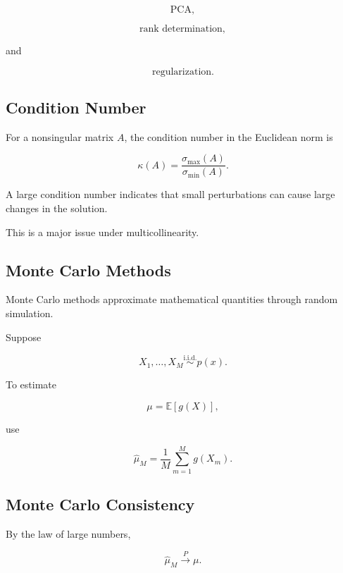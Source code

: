 \[
\boxed{
\text{PCA},
}
\]

\[
\boxed{
\text{rank determination},
}
\]

and

\[
\boxed{
\text{regularization}.
}
\]

\subsection{Condition Number}
\label{subsec:condition-number-statistics}

For a nonsingular matrix \(A\), the condition number in the Euclidean norm
is

\[
\boxed{
\kappa(A)
=
\frac{
\sigma_{\max}(A)
}{
\sigma_{\min}(A)
}.
}
\]

A large condition number indicates that small perturbations can cause
large changes in the solution.

This is a major issue under multicollinearity.

\subsection{Monte Carlo Methods}
\label{subsec:monte-carlo-methods-statistics}

Monte Carlo methods approximate mathematical quantities through random
simulation.

Suppose

\[
X_1,\ldots,X_M
\overset{\text{i.i.d.}}{\sim}
p(x).
\]

To estimate

\[
\mu
=
\mathbb{E}
[
g(X)
],
\]

use

\[
\boxed{
\widehat{\mu}_M
=
\frac1M
\sum_{m=1}^{M}
g(X_m).
}
\]

\subsection{Monte Carlo Consistency}
\label{subsec:monte-carlo-consistency}

By the law of large numbers,

\[
\boxed{
\widehat{\mu}_M
\xrightarrow{P}
\mu.
}
\]


